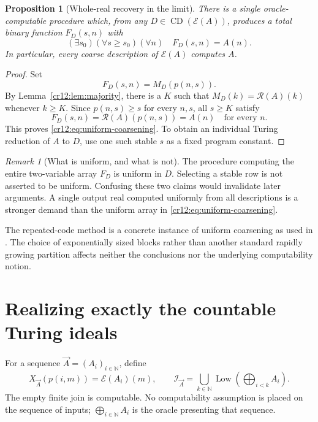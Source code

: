\documentclass[11pt,letterpaper]{article}
\theoremstyle{plain}
\newtheorem{proposition}[theorem]{Proposition}
\theoremstyle{definition}
\theoremstyle{remark}
\newtheorem{remark}[theorem]{Remark}
\numberwithin{equation}{section}
\newcommand{\N}{\mathbb N}
\newcommand{\CD}{\operatorname{CD}}
\newcommand{\Low}{\operatorname{Low}}
\newcommand{\Rcode}{\mathcal R}
\newcommand{\Ecode}{\mathcal E}
\newcommand{\I}{\mathcal I}
\newcommand{\joinvec}{\bigoplus_{i\in\N}}
\begin{document}
\begin{proposition}[Whole-real recovery in the limit]\label{cr12:prop:robust}
There is a single oracle-computable procedure which, from any
$D\in\CD(\Ecode(A))$, produces a total binary function $F_D(s,n)$ with
\begin{equation}\label{cr12:eq:uniform-coarsening}
 (\exists s_0)(\forall s\ge s_0)(\forall n)\quad F_D(s,n)=A(n).
\end{equation}
In particular, every coarse description of $\Ecode(A)$ computes $A$.
\end{proposition}
\begin{proof}
Set
\[
 F_D(s,n)=M_D(p(n,s)).
\]
By Lemma~\ref{cr12:lem:majority}, there is a $K$ such that
$M_D(k)=\Rcode(A)(k)$ whenever $k\ge K$. Since $p(n,s)\ge s$ for every
$n,s$, all $s\ge K$ satisfy
\[
 F_D(s,n)=\Rcode(A)(p(n,s))=A(n)
 \quad\text{for every }n.
\]
This proves \eqref{cr12:eq:uniform-coarsening}. To obtain an individual Turing
reduction of $A$ to $D$, use one such stable $s$ as a fixed program constant.
\end{proof}

\begin{remark}[What is uniform, and what is not]\label{cr12:rem:uniform}
The procedure computing the entire two-variable array $F_D$ is uniform in $D$.
Selecting a stable row is not asserted to be uniform. Confusing these two claims
would invalidate later arguments. A single output real computed uniformly from
all descriptions is a stronger demand than the uniform array in
\eqref{cr12:eq:uniform-coarsening}.
\end{remark}

The repeated-code method is a concrete instance of uniform coarsening as used
in \cite[Definition~2.1 and Proposition~2.3]{HJKS}. The choice of exponentially
sized blocks rather than another standard rapidly growing partition affects
neither the conclusions nor the underlying computability notion.

\section{Realizing exactly the countable Turing ideals}\label{cr12:sec:ideals}
For a sequence $\vec A=(A_i)_{i\in\N}$, define
\begin{equation}\label{cr12:eq:idealcode}
 X_{\vec A}(p(i,m))=\Ecode(A_i)(m),
 \qquad
 \I_{\vec A}=\bigcup_{k\in\N}
 \Low\!\left(\bigoplus_{i<k}A_i\right).
\end{equation}
The empty finite join is computable. No computability assumption is placed on
the sequence of inputs; $\joinvec A_i$ is the oracle presenting that sequence.
\end{document}
